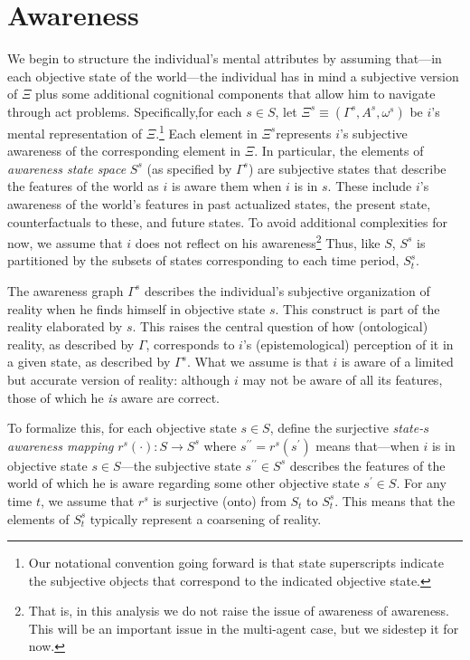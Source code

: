 \documentclass[
11pt,
titlepage,
reqno,
]{article}%
\theoremstyle{definition}
\begin{document}
\section{Awareness}
We begin to structure the individual's mental attributes by assuming that---in each objective state of the world---the individual has in mind a subjective version of $\Xi$ plus some additional cognitional components that allow him to navigate through act problems. 
Specifically,for each $s\in S$,  let $\Xi^s\equiv(\Gamma^s,A^s,\omega^s)$ be $i$'s mental representation of $\Xi$.\footnote
{
	Our notational convention going forward is that state superscripts indicate the subjective objects that correspond to the indicated objective state.
}
Each element in $\Xi^s$represents $i$'s subjective awareness of the corresponding element in $\Xi$.
In particular, the elements of \textit{awareness state space} $S^s$ (as specified by $\Gamma^s$) are subjective states that describe the features of the world as $i$ is aware them when $i$ is in $s$.
These include $i$'s awareness of the world's features in past actualized states, the present state, counterfactuals to these, and future states.
To avoid additional complexities for now, we assume that $i$ does not reflect on his awareness\footnote
{ 
	That is, in this analysis we do not raise the issue of awareness of awareness. 
	This will be an important issue in the multi-agent case, but we sidestep it for now.
}
Thus, like $S$, $S^s$ is partitioned by the subsets of states corresponding to each time period, $S^s_t$.

The awareness graph $\Gamma^s$ describes the individual's subjective organization of reality when he finds himself in objective state $s$. 
This construct is part of the reality elaborated by  $s$.
This raises the central question of how (ontological) reality, as described by $\Gamma$, corresponds to $i$'s (epistemological) perception of it in a given state, as described by $\Gamma^s$.
What we assume is that $i$ is aware of a limited but accurate version of reality: although $i$ may not be aware of all its features,  those of which he \textit{is} aware are correct. 

To formalize this, for each objective state $s\in S$, define the surjective \textit{state-$s$ awareness mapping} $r^s(\cdot):S\rightarrow S^s$ where $s^{\prime\prime}=r^s(s^\prime)$ means that---when $i$ is in objective state $s\in S$---the subjective state $s^{\prime\prime}\in S^s$ describes the features  of the world of which he is aware regarding some other objective state $s^\prime\in S$.
For any time $t$, we assume that $r^s$ is surjective (onto) from $S_t$ to $S^s_t$.
This means that the elements of $S^s_t$ typically represent a coarsening of reality.
\end{document}
